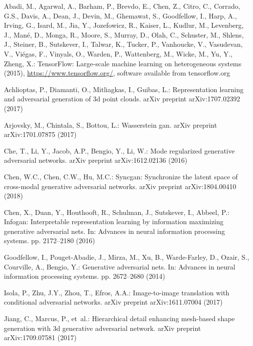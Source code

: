 \documentclass[runningheads]{llncs}
\begin{document}
\clearpage
\begin{thebibliography}{10}

Abadi, M., Agarwal, A., Barham, P., Brevdo, E., Chen, Z., Citro, C., Corrado,
   G.S., Davis, A., Dean, J., Devin, M., Ghemawat, S., Goodfellow, I.,  
Harp, A.,
   Irving, G., Isard, M., Jia, Y., Jozefowicz, R., Kaiser, L., Kudlur, M.,
   Levenberg, J., Man\'{e}, D., Monga, R., Moore, S., Murray, D., Olah, C.,
   Schuster, M., Shlens, J., Steiner, B., Sutskever, I., Talwar, K.,  
Tucker, P.,
   Vanhoucke, V., Vasudevan, V., Vi\'{e}gas, F., Vinyals, O., Warden, P.,
   Wattenberg, M., Wicke, M., Yu, Y., Zheng, X.: {TensorFlow}: Large-scale
   machine learning on heterogeneous systems (2015),
   \url{https://www.tensorflow.org/}, software available from tensorflow.org

Achlioptas, P., Diamanti, O., Mitliagkas, I., Guibas, L.: Representation
   learning and adversarial generation of 3d point clouds. arXiv preprint
   arXiv:1707.02392  (2017)

Arjovsky, M., Chintala, S., Bottou, L.: Wasserstein gan. arXiv preprint
   arXiv:1701.07875  (2017)

Che, T., Li, Y., Jacob, A.P., Bengio, Y., Li, W.: Mode regularized generative
   adversarial networks. arXiv preprint arXiv:1612.02136  (2016)

Chen, W.C., Chen, C.W., Hu, M.C.: Syncgan: Synchronize the latent space of
   cross-modal generative adversarial networks. arXiv preprint arXiv:1804.00410
   (2018)

Chen, X., Duan, Y., Houthooft, R., Schulman, J., Sutskever, I., Abbeel, P.:
   Infogan: Interpretable representation learning by information maximizing
   generative adversarial nets. In: Advances in neural information processing
   systems. pp. 2172--2180 (2016)

Goodfellow, I., Pouget-Abadie, J., Mirza, M., Xu, B., Warde-Farley, D., Ozair,
   S., Courville, A., Bengio, Y.: Generative adversarial nets. In: Advances in
   neural information processing systems. pp. 2672--2680 (2014)

Isola, P., Zhu, J.Y., Zhou, T., Efros, A.A.: Image-to-image translation with
   conditional adversarial networks. arXiv preprint arXiv:1611.07004 (2017)

Jiang, C., Marcus, P., et~al.: Hierarchical detail enhancing mesh-based shape
   generation with 3d generative adversarial network. arXiv preprint
   arXiv:1709.07581  (2017)


\end{thebibliography}
\end{document}
